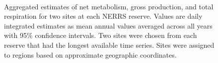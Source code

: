 
\begin{figure}[!h]
{\centering \includegraphics[width=0.00\textwidth]{figure/metab_plo-1} 

}

\caption[Aggregated estimates of net metabolism, gross production, and total respiration for two sites at each NERRS reserve]{Aggregated estimates of net metabolism, gross production, and total respiration for two sites at each NERRS reserve.  Values are daily integrated estimates as mean annual values averaged across all years with 95\% confidence intervals.  Two sites were chosen from each reserve that had the longest available time series. Sites were assigned to regions based on approximate geographic coordinates.}\label{fig:metab_plo}
\end{figure}



